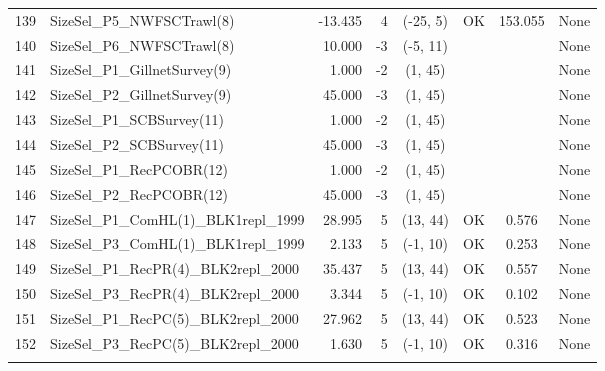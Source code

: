 \documentclass[12pt,]{article}
\begin{document}
\begin{landscape}
\begin{longtable}{rlrrcccl}
  139 & SizeSel\_P5\_NWFSCTrawl(8) & -13.435 & 4 & (-25, 5) & OK & 153.055 & None \\ 
  140 & SizeSel\_P6\_NWFSCTrawl(8) & 10.000 & -3 & (-5, 11) &  &  & None \\ 
  141 & SizeSel\_P1\_GillnetSurvey(9) & 1.000 & -2 & (1, 45) &  &  & None \\ 
  142 & SizeSel\_P2\_GillnetSurvey(9) & 45.000 & -3 & (1, 45) &  &  & None \\ 
  143 & SizeSel\_P1\_SCBSurvey(11) & 1.000 & -2 & (1, 45) &  &  & None \\ 
  144 & SizeSel\_P2\_SCBSurvey(11) & 45.000 & -3 & (1, 45) &  &  & None \\ 
  145 & SizeSel\_P1\_RecPCOBR(12) & 1.000 & -2 & (1, 45) &  &  & None \\ 
  146 & SizeSel\_P2\_RecPCOBR(12) & 45.000 & -3 & (1, 45) &  &  & None \\ 
  147 & SizeSel\_P1\_ComHL(1)\_BLK1repl\_1999 & 28.995 & 5 & (13, 44) & OK & 0.576 & None \\ 
  148 & SizeSel\_P3\_ComHL(1)\_BLK1repl\_1999 & 2.133 & 5 & (-1, 10) & OK & 0.253 & None \\ 
  149 & SizeSel\_P1\_RecPR(4)\_BLK2repl\_2000 & 35.437 & 5 & (13, 44) & OK & 0.557 & None \\ 
  150 & SizeSel\_P3\_RecPR(4)\_BLK2repl\_2000 & 3.344 & 5 & (-1, 10) & OK & 0.102 & None \\ 
  151 & SizeSel\_P1\_RecPC(5)\_BLK2repl\_2000 & 27.962 & 5 & (13, 44) & OK & 0.523 & None \\ 
  152 & SizeSel\_P3\_RecPC(5)\_BLK2repl\_2000 & 1.630 & 5 & (-1, 10) & OK & 0.316 & None \\ 
   \hline
\hline
\label{tab:model_params}
\end{longtable}
\end{landscape}

\FloatBarrier

\newpage
\end{document}
